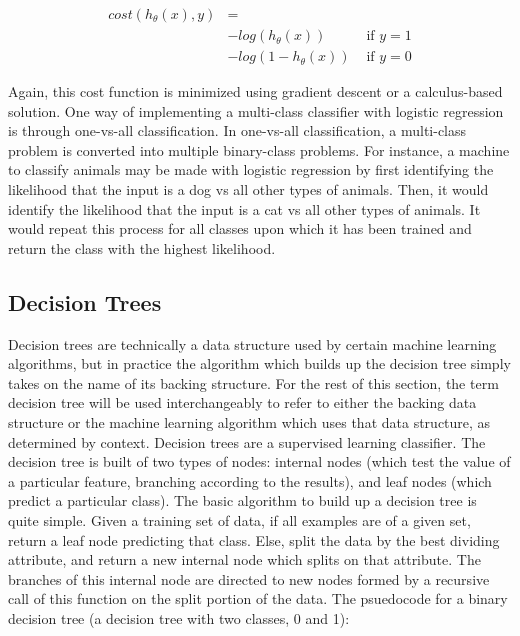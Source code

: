 \begin{align*} 
cost(h_\theta(x), y) &= \\
	& -log(h_\theta(x)) 	&\text{ if } y = 1\\
	& -log(1 - h_\theta(x))	&\text{ if } y = 0
\end{align*} 

Again, this cost function is minimized using gradient descent or a calculus-based solution. One way of implementing a multi-class classifier with logistic regression is through one-vs-all classification. In one-vs-all classification, a multi-class problem is converted into multiple binary-class problems. For instance, a machine to classify animals may be made with logistic regression by first identifying the likelihood that the input is a dog vs all other types of animals. Then, it would identify the likelihood that the input is a cat vs all other types of animals. It would repeat this process for all classes upon which it has been trained and return the class with the highest likelihood. 


\subsection{Decision Trees}

Decision trees are technically a data structure used by certain machine learning algorithms, but in practice the algorithm which builds up the decision tree simply takes on the name of its backing structure. For the rest of this section, the term decision tree will be used interchangeably to refer to either the backing data structure or the machine learning algorithm which uses that data structure, as determined by context. Decision trees are a supervised learning classifier. The decision tree is built of two types of nodes: internal nodes (which test the value of a particular feature, branching according to the results), and leaf nodes (which predict a particular class). The basic algorithm to build up a decision tree is quite simple. Given a training set of data, if all examples are of a given set, return a leaf node predicting that class. Else, split the data by the best dividing attribute, and return a new internal node which splits on that attribute. The branches of this internal node are directed to new nodes formed by a recursive call of this function on the split portion of the data. \cite{website:domingos} The psuedocode for a binary decision tree (a decision tree with two classes, 0 and 1):

